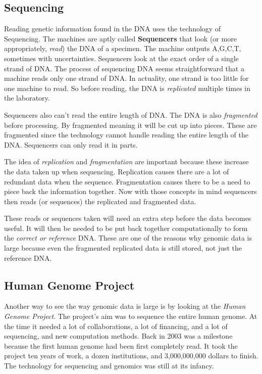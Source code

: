 \documentclass{article}
\begin{document}
\subsection{Sequencing}

Reading genetic information found in the DNA uses the technology of Sequencing. The machines are aptly called \textbf{Sequencers} that look (or more appropriately, \textit{read}) the DNA of a specimen. The machine outputs A,G,C,T, sometimes with uncertainties. Sequencers look at the exact order of a single strand of DNA. The process of sequencing DNA seems straightforward that a machine reads only one strand of DNA. In actuality, one strand is too little for one machine to read. So before reading, the DNA is \textit{replicated} multiple times in the laboratory. 

Sequencers also can't read the entire length of DNA. The DNA is also \textit{fragmented} before processing. By fragmented meaning it will be cut up into pieces. These are fragmented since the technology cannot handle reading the entire length of the DNA. Sequencers can only read it in parts. 


The idea of \textit{replication} and \textit{fragmentation} are important because these increase the data taken up when sequencing. Replication causes there are a lot of redundant data when the sequence. Fragmentation causes there to be a need to piece back the information together. Now with those concepts in mind sequencers then reads (or sequences) the replicated and fragmented data.


These reads or sequences taken will need an extra step before the data becomes useful. It will then be needed to be put back together computationally to form the \textit{correct or reference} DNA. These are one of the reasons why genomic data is large because even the fragmented replicated data is still stored, not just the reference DNA.

\subsection{Human Genome Project}

Another way to see the way genomic data is large is by looking at the \textit{Human Genome Project}. The project's aim was to sequence the entire human genome. At the time it needed a lot of collaborations, a lot of financing, and a lot of sequencing, and new computation methods. Back in 2003 was a milestone because the first human genome \autocite{introgenomics} had been first completely read. It took the project ten years of work, a dozen institutions, and 3,000,000,000 dollars to finish. The technology for sequencing and genomics was still at its infancy. 
\end{document}
